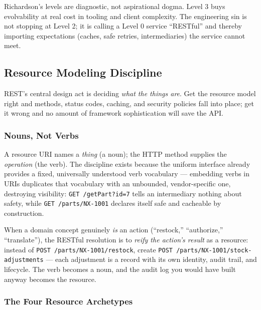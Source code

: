 \begin{warningbox}
Richardson's levels are diagnostic, not aspirational dogma. Level 3 buys
evolvability at real cost in tooling and client complexity. The engineering sin is
not stopping at Level 2; it is calling a Level 0 service ``RESTful'' and thereby
importing expectations (caches, safe retries, intermediaries) the service cannot
meet.
\end{warningbox}

\subsection{Resource Modeling Discipline}
\label{sec:ch3-resources}

REST's central design act is deciding \emph{what the things are}. Get the resource
model right and methods, status codes, caching, and security policies fall into
place; get it wrong and no amount of framework sophistication will save the API.

\subsubsection{Nouns, Not Verbs}

A resource URI names a \emph{thing} (a noun); the HTTP method supplies the
\emph{operation} (the verb). The discipline exists because the uniform interface
already provides a fixed, universally understood verb vocabulary --- embedding
verbs in URIs duplicates that vocabulary with an unbounded, vendor-specific one,
destroying visibility: \texttt{GET /getPart?id=7} tells an intermediary nothing
about safety, while \texttt{GET /parts/NX-1001} declares itself safe and cacheable
by construction.

When a domain concept genuinely \emph{is} an action (``restock,'' ``authorize,''
``translate''), the RESTful resolution is to \emph{reify the action's result} as a
resource: instead of \texttt{POST /parts/NX-1001/restock}, create
\texttt{POST /parts/NX-1001/stock-adjustments} --- each adjustment is a record
with its own identity, audit trail, and lifecycle. The verb becomes a noun, and
the audit log you would have built anyway becomes the resource.

\subsubsection{The Four Resource Archetypes}

